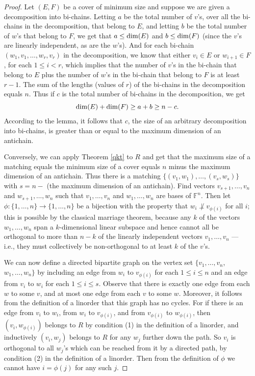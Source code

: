 \documentclass{amsart}
\theoremstyle{definition}
\begin{document}
\begin{proof}
Let $(E,F)$ be a cover of minimum size and suppose we are given a decomposition into bi-chains. Letting $a$ be the total number of $v$'s, over all the bi-chains in the decomposition, that belong to $E$, and letting $b$ be the total number of $w$'s that belong to $F$, we get that $a \leq {\rm dim}(E)$ and $b \leq {\rm dim}(F)$ (since the $v$'s are linearly independent, as are the $w$'s). And for each bi-chain $(w_1, v_1, \ldots, w_r, v_r)$ in the decomposition, we know that either $v_i \in E$ or $w_{i+1} \in F$, for each $1 \leq i < r$, which implies that the number of $v$'s in the bi-chain that belong to $E$ plus the number of $w$'s in the bi-chain that belong to $F$ is at least $r - 1$. The sum of the lengths (values of $r$) of the bi-chains in the decomposition equals $n$. Thus if $c$ is the total number of bi-chains in the decomposition, we get $${\rm dim}(E) + {\rm dim}(F) \geq a + b \geq n - c.$$ According to the lemma, it follows that $c$, the size of an arbitrary decomposition into bi-chains, is greater than or equal to the maximum dimension of an antichain.

Conversely, we can apply Theorem \ref{qkt} to $R$ and get that the maximum size of a matching equals the minimum size of a cover equals $n$ minus the maximum dimension of an antichain. Thus there is a matching $\{(v_1, w_1), \ldots, (v_s, w_s)\}$ with $s = n -$ (the maximum dimension of an antichain). Find vectors $v_{s+1}, \ldots, v_n$ and $w_{s+1}, \ldots, w_n$ such that $v_1, \ldots, v_n$ and $w_1, \ldots, w_n$ are bases of $\mathbb{F}^n$. Then let $\phi: \{1, \ldots, n\} \to \{1, \ldots, n\}$ be a bijection with the property that $w_i \not\perp v_{\phi(i)}$ for all $i$; this is possible by the classical marriage theorem, because any $k$ of the vectors $w_1, \ldots, w_n$ span a $k$-dimensional linear subspace and hence cannot all be orthogonal to more than $n-k$ of the linearly independent vectors $v_1, \ldots, v_n$ --- i.e., they must collectively be non-orthogonal to at least $k$ of the $v$'s.

We can now define a directed bipartite graph on the vertex set $\{v_1, \ldots, v_n$, $w_1, \ldots, w_n\}$ by including an edge from $w_i$ to $v_{\phi(i)}$ for each $1 \leq i \leq n$ and an edge from $v_i$ to $w_i$ for each $1 \leq i \leq s$. Observe that there is exactly one edge from each $w$ to some $v$, and at most one edge from each $v$ to some $w$. Moreover, it follows from the definition of a linorder that this graph has no cycles. For if there is an edge from $v_i$ to $w_i$, from $w_i$ to $v_{\phi(i)}$, and from $v_{\phi(i)}$ to $w_{\phi(i)}$, then $(v_i, w_{\phi(i)})$ belongs to $R$ by condition (1) in the definition of a linorder, and inductively $(v_i, w_j)$ belongs to $R$ for any $w_j$ further down the path. So $v_i$ is orthogonal to all $w_j$'s which can be reached from it by a directed path, by condition (2) in the definition of a linorder. Then from the definition of $\phi$ we cannot have $i = \phi(j)$ for any such $j$.


\end{proof}
\end{document}
